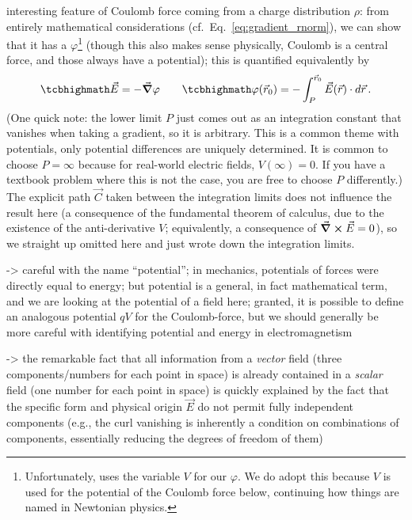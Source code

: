 \documentclass[../class_mech_main.tex]{subfiles}
\begin{document}
interesting feature of Coulomb force coming from a charge distribution $\rho$: from entirely mathematical considerations (cf.~Eq.~\eqref{eq:gradient_rnorm}), we can show that it has a  $\varphi$\footnote{Unfortunately, \cite{Griffiths_2017} uses the variable $V$ for our $\varphi$. We do adopt this because $V$ is used for the potential of the Coulomb force below, continuing how things are named in Newtonian physics.} (though this also makes sense physically, Coulomb is a central force, and those always have a potential); this is quantified equivalently by
\begin{equation}
    \eqbox{
        \vec{E} = - \grad \varphi
    }
    \quad \quad
    \eqbox{
        \varphi(\vec{r}_0) = - \int_{P}^{\vec{r}_0} \vec{E}(\vec{r}) \cdot d\vec{r}
    } \, .
\end{equation}
(One quick note: the lower limit $P$ just comes out as an integration constant that vanishes when taking a gradient, so it is arbitrary. This is a common theme with potentials, only potential differences are uniquely determined. It is common to choose $P = \infty$ because for real-world electric fields, $V(\infty) = 0$. If you have a textbook problem where this is not the case, you are free to choose $P$ differently.) The explicit path $\vec{C}$ taken between the integration limits does not influence the result here (a consequence of the fundamental theorem of calculus, due to the existence of the anti-derivative $V$; equivalently, a consequence of $\curl \vec{E} = 0$), so we straight up omitted here and just wrote down the integration limits.


-> careful with the name \enquote{potential}; in mechanics, potentials of forces were directly equal to energy; but potential is a general, in fact mathematical term, and we are looking at the potential of a field here; granted, it is possible to define an analogous potential $q V$ for the Coulomb-force, but we should generally be more careful with identifying potential and energy in electromagnetism

-> the remarkable fact that all information from a \emph{vector} field (three components/numbers for each point in space) is already contained in a \emph{scalar} field (one number for each point in space) is quickly explained by the fact that the specific form and physical origin $\vec{E}$ do not permit fully independent components (e.g., the curl vanishing is inherently a condition on combinations of components, essentially reducing the degrees of freedom of them)
\end{document}
